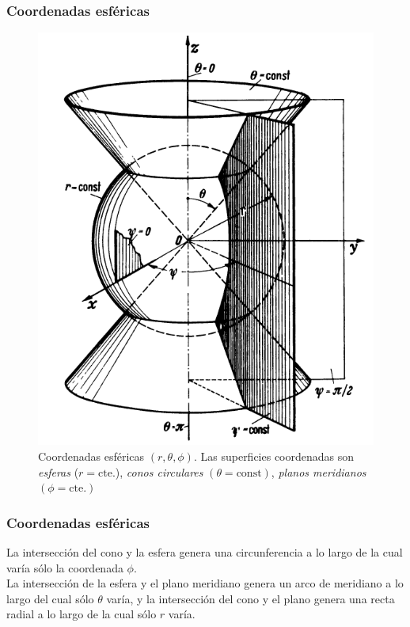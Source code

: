 \documentclass[12pt]{beamer}
\begin{document}
\begin{frame}
\frametitle{Coordenadas esféricas}
\begin{figure}[h!]
   \centering
   \includegraphics{Imagenes/Planos_Coordenadas_Esfericas.png}
   \caption{Coordenadas esféricas $(r, \theta, \phi)$. Las superficies coordenadas son \emph{esferas} ($r = \mbox{cte.}$), \emph{conos circulares} $(\theta = \mbox{const})$, \emph{planos meridianos} $(\phi = \mbox{cte.})$}
   \label{fig:figura_planos_esfericos}
\end{figure}
\end{frame}
\begin{frame}
\frametitle{Coordenadas esféricas}
La intersección del cono y la esfera genera una circunferencia a lo largo de la cual varía
sólo la coordenada $\phi$.
\\
\bigskip
\pause
La intersección de la esfera y el plano meridiano genera un arco de meridiano a lo largo del cual sólo $\theta$ varía, y la intersección del cono y el plano genera una recta radial a lo largo de la cual sólo $r$ varía.
\end{frame}
\end{document}
